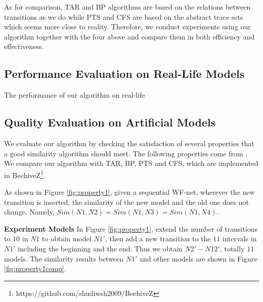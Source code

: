\documentclass{llncs}
\begin{document}
As for comparison, TAR and BP algorithms are based on the relations between transitions as we do while PTS and CFS are based on the abstract trace sets which seems more close to reality. Therefore, we conduct experiments using our algorithm together with the four above and compare them in both efficiency and effectiveness.

\subsection{Performance Evaluation on Real-Life Models}\label{subsec:performance}
The performance of our algorithm on real-life

\subsection{Quality Evaluation on Artificial Models}\label{subsec:quality}
We evaluate our algorithm by checking the satisfaction of several properties that a good similarity algorithm should meet. The following properties come from \cite{wang2013ssdt,wang2014tager,wang2015tar++}. We compare our algorithm with TAR, BP, PTS and CFS, which are implemented in BeehiveZ\footnote{https://github.com/shudiwsh2009/BeehiveZ}.

\begin{property}\label{prop:1}
As shown in Figure \ref{fig:property1}, given a sequential WF-net, wherever the new transition is inserted, the similarity of the new model and the old one does not change. Namely, $Sim(N1,N2)=Sim(N1,N3)=Sim(N1,N4)$.
\end{property}
\textbf{Experiment Models} In Figure \ref{fig:property1}, extend the number of transitions to $10$ in $N1$ to obtain model $N1'$, then add a new transition to the $11$ intervals in $N1'$ including the beginning and the end. Thus we obtain $N2'-N12'$, totally $11$ models. The similarity results between $N1'$ and other models are shown in Figure \ref{fig:property1comp}.
\end{document}
